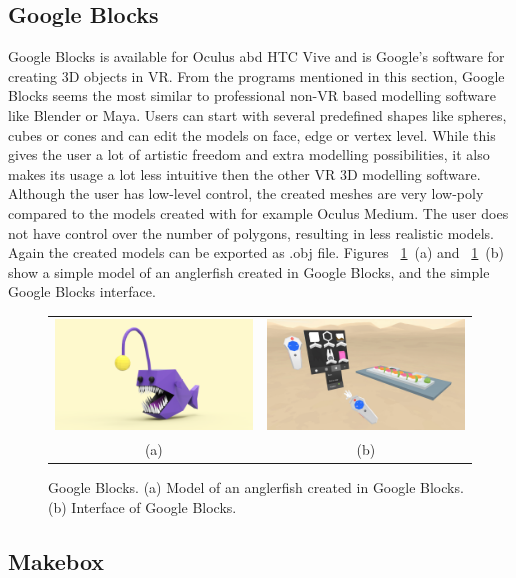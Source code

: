 \subsection{Google Blocks}
Google Blocks is available for Oculus abd HTC Vive and is Google's software for creating 3D objects in VR. From the programs mentioned in this section, Google Blocks seems the most similar to professional non-VR based modelling software like Blender or Maya. Users can start with several predefined shapes like spheres, cubes or cones and can edit the models on face, edge or vertex level. While this gives the user a lot of artistic freedom and extra modelling possibilities, it also makes its usage a lot less intuitive then the other VR 3D modelling software. Although the user has low-level control, the created meshes are very low-poly compared to the models created with for example Oculus Medium. The user does not have control over the number of polygons, resulting in less realistic models. Again the created models can be exported as .obj file. Figures ~\ref{fig:blocks}~(a) and ~\ref{fig:blocks}~(b) show a simple model of an anglerfish created in Google Blocks, and the simple Google Blocks interface.

\begin{figure}[!h]
    \centering
    \setlength{\tabcolsep}{0.0130\linewidth}
    \begin{tabular}{@{}cc@{}}
   	\includegraphics[width=0.487\linewidth]{figures/blocks_anglerfish}&
   	\includegraphics[width=0.487\linewidth]{figures/blocks_interface}\\
    (a)&(b)\\
    \end{tabular}
    \caption[Google Blocks]{Google Blocks.
    	  \textup{(a)} Model of an anglerfish created in Google Blocks.
			  \textup{(b)} Interface of Google Blocks. 
      \label{fig:blocks}}
\end{figure}

\subsection{Makebox}



